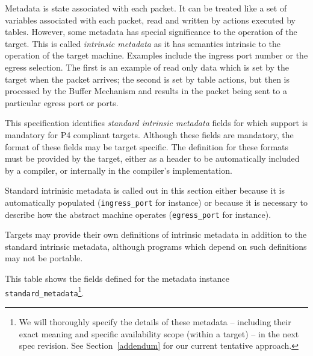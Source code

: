 \documentclass[12pt]{article}
\begin{document}

Metadata is state associated with each packet. It can be treated like a set 
of variables associated with each packet, read and written by actions executed 
by tables. However, some metadata has special significance to the operation 
of the target. This is called \textit{intrinsic metadata} as it has semantics intrinsic 
to the operation of the target machine. Examples include the ingress port number 
or the egress selection. The first is an example of read only data which is 
set by the target when the packet arrives; the second is set by table actions, 
but then is processed by the Buffer Mechanism and results in the packet being 
sent to a particular egress port or ports.

This specification identifies \textit{standard intrinsic metadata} fields for which 
support is mandatory for P4 compliant targets. Although these fields are mandatory, 
the format of these fields may be target specific. The definition for these 
formats must be provided by the target, either as a header to be automatically 
included by a compiler, or internally in the compiler's implementation.

Standard intrinisic metadata is called out in this section either because 
it is automatically populated (\texttt{ingress_port} for instance) or because it 
is necessary to describe how the abstract machine operates (\texttt{egress_port} for 
instance).

Targets may provide their own definitions of intrinsic metadata in addition to the standard
intrinsic metadata, although programs which depend on such definitions may not be portable.

This table shows the fields defined for the metadata instance 
\texttt{standard_metadata}\footnote{We will thoroughly specify the details of these metadata 
-- including their exact meaning and specific availability scope (within a target) -- in 
the next spec revision. See Section~\ref{addendum} for our current tentative approach.}.
\end{document}
